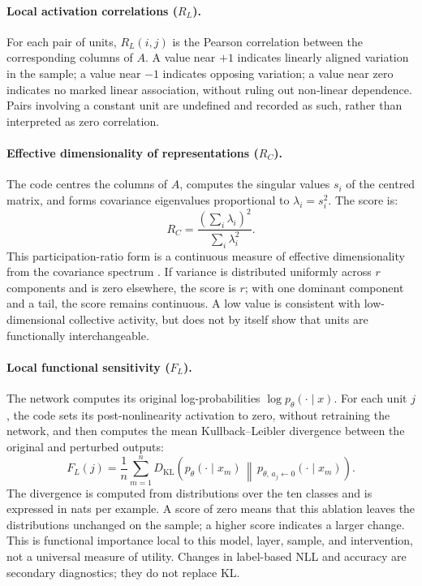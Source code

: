 \documentclass[11pt,a4paper]{article}
\newcommand{\KL}{D_{\mathrm{KL}}}
\begin{document}
\paragraph{Local activation correlations ($R_L$).}
For each pair of units, $R_L(i,j)$ is the Pearson correlation between the corresponding columns of $A$. A value near $+1$ indicates linearly aligned variation in the sample; a value near $-1$ indicates opposing variation; a value near zero indicates no marked linear association, without ruling out non-linear dependence. Pairs involving a constant unit are undefined and recorded as such, rather than interpreted as zero correlation.

\paragraph{Effective dimensionality of representations ($R_C$).}
The code centres the columns of $A$, computes the singular values $s_i$ of the centred matrix, and forms covariance eigenvalues proportional to $\lambda_i=s_i^2$. The score is:
\[
 R_C=\frac{\left(\sum_i\lambda_i\right)^2}{\sum_i\lambda_i^2}.
\]
This participation-ratio form is a continuous measure of effective dimensionality from the covariance spectrum \citep{diedrichsen2013dimensionality}. If variance is distributed uniformly across $r$ components and is zero elsewhere, the score is $r$; with one dominant component and a tail, the score remains continuous. A low value is consistent with low-dimensional collective activity, but does not by itself show that units are functionally interchangeable.

\paragraph{Local functional sensitivity ($F_L$).}
The network computes its original log-probabilities $\log p_{\theta}(\cdot\mid x)$. For each unit $j$, the code sets its post-nonlinearity activation to zero, without retraining the network, and then computes the mean Kullback--Leibler divergence between the original and perturbed outputs:
\[
 F_L(j)=\frac{1}{n}\sum_{m=1}^{n}
 \KL\!\left(p_{\theta}(\cdot\mid x_m)
 \,\middle\|\,
 p_{\theta,\,a_j\leftarrow 0}(\cdot\mid x_m)\right).
\]
The divergence is computed from distributions over the ten classes and is expressed in nats per example. A score of zero means that this ablation leaves the distributions unchanged on the sample; a higher score indicates a larger change. This is functional importance local to this model, layer, sample, and intervention, not a universal measure of utility. Changes in label-based NLL and accuracy are secondary diagnostics; they do not replace KL.
\end{document}
